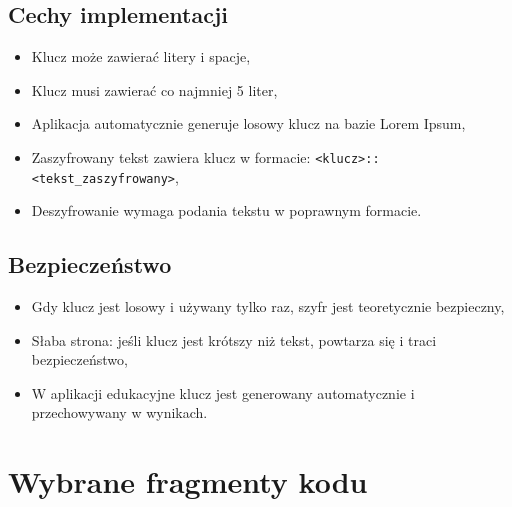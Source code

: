 \documentclass[12pt,a4paper]{article}
\begin{document}
\subsection{Cechy implementacji}
\begin{itemize}
    \item Klucz może zawierać litery i spacje,
    \item Klucz musi zawierać co najmniej 5 liter,
    \item Aplikacja automatycznie generuje losowy klucz na bazie Lorem Ipsum,
    \item Zaszyfrowany tekst zawiera klucz w formacie: \texttt{<klucz>::<tekst\_zaszyfrowany>},
    \item Deszyfrowanie wymaga podania tekstu w poprawnym formacie.
\end{itemize}

\subsection{Bezpieczeństwo}
\begin{itemize}
    \item Gdy klucz jest losowy i używany tylko raz, szyfr jest teoretycznie bezpieczny,
    \item Słaba strona: jeśli klucz jest krótszy niż tekst, powtarza się i traci bezpieczeństwo,
    \item W aplikacji edukacyjne klucz jest generowany automatycznie i przechowywany w wynikach.
\end{itemize}

\newpage
\section{Wybrane fragmenty kodu}
\end{document}
